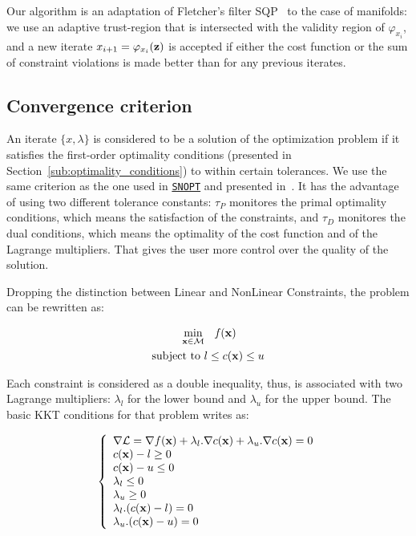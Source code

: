 Our algorithm is an adaptation of Fletcher's filter SQP~\cite{fletcher:mathprog:2000} to the case of manifolds: we use an adaptive trust-region that is intersected with the validity region of $\varphi_{x_i}$, and a new iterate $x_{i+1} = \varphi_{x_i}({\bf z})$ is accepted if either the cost function or the sum of constraint violations is made better than for any previous iterates.

\subsection{Convergence criterion}
\label{sub:convergence_criterion}

An iterate $\{x,\lambda\}$ is considered to be a solution of the optimization problem if it satisfies the first-order optimality conditions (presented in Section~\ref{sub:optimality_conditions}) to within certain tolerances.
We use the same criterion as the one used in \href{http://www.sbsi-sol-optimize.com/asp/sol_product_snopt.htm}{{\tt SNOPT}} and presented in~\cite{gill:snopt:2002}.
It has the advantage of using two different tolerance constants: $\tau_P$ monitores the primal optimality conditions, which means the satisfaction of the constraints, and $\tau_D$ monitores the dual conditions, which means the optimality of the cost function and of the Lagrange multipliers.
That gives the user more control over the quality of the solution.

Dropping the distinction between Linear and NonLinear Constraints,
the problem can be rewritten as:

\begin{align}
\begin{split}
\label{eq:problem}
  \min_{\bf x \in \mathcal{M}} & \quad \mbox{\emph{f}}({\bf x}) \\
  \text{subject to }&
  l \leq c({\bf x}) \leq u \\
\end{split}
\end{align}

Each constraint is considered as a double inequality, thus, is associated with two Lagrange multipliers: $\lambda_l$ for the lower bound and $\lambda_u$ for the upper bound.
The basic KKT conditions for that problem writes as:

\begin{equation}
\label{KKT}
\left\{
\begin{array}{lr}
  \nabla \mathcal{L} = \nabla f({\bf x}) + \lambda_l.\nabla c({\bf x}) + \lambda_u.\nabla
c({\bf x}) = 0 \\
  c({\bf x}) - l \geq 0 \\
  c({\bf x}) - u \leq 0 \\
  \lambda_l \leq 0 \\
  \lambda_u \geq 0 \\
  \lambda_l.(c({\bf x})-l) = 0 \\
  \lambda_u.(c({\bf x})-u) = 0
\end{array}
\right.
\end{equation}


